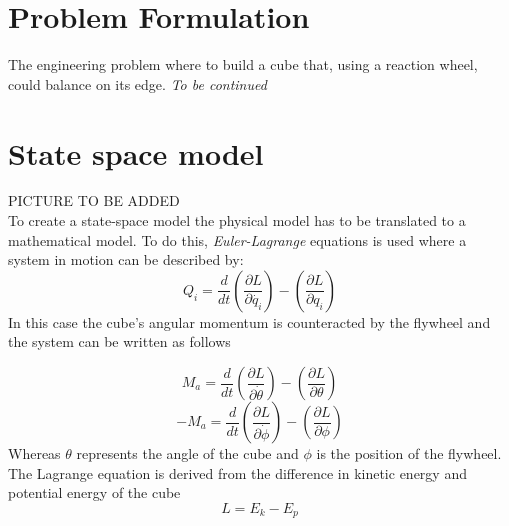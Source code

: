 \documentclass[a4paper,11pt]{kth-mag}
\begin{document}
\section{Problem Formulation}

The engineering problem where to build a cube that, using a reaction wheel, could balance on its edge.
\emph{To be continued}
\section{State space model}
PICTURE TO BE ADDED
\\
To create a state-space model the physical model has to be translated to a mathematical model. To do this, \emph{Euler-Lagrange} equations is used where a system in motion can be described by:
\begin{equation}
Q_i=\frac{d}{dt}\left(\frac{\partial L}{\partial \dot{q_i}}\right)-\left(\frac{\partial L}{\partial q_i}\right)
\end{equation}
In this case the cube's angular momentum is counteracted by the flywheel and the system can be written as follows

\begin{equation} \label{eq:positiveL}
M_a=\frac{d}{dt}\left(\frac{\partial L}{\partial \dot{\theta}}\right)-\left(\frac{\partial L}{\partial \theta}\right)
\end{equation}
\begin{equation} \label{eq:negativeL}
-M_a=\frac{d}{dt}\left(\frac{\partial L}{\partial \dot{\phi}}\right)-\left(\frac{\partial L}{\partial \phi}\right)
\end{equation}
Whereas $\theta$ represents the angle of the cube and $\phi$ is the position of the flywheel. \\
The Lagrange equation is derived from the difference in kinetic energy and potential energy of the cube
\begin{equation} \label{eq:Lagrange}
L = E_k - E_p
\end{equation}
\end{document}

